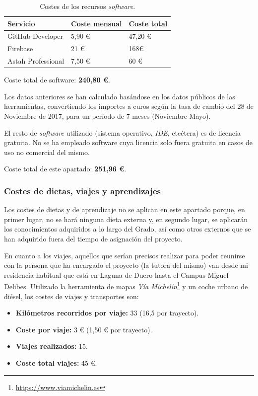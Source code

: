 \documentclass[twoside]{report}
\begin{document}
\begin{table}[H]
\centering
\begin{tabular}{|l|l|l|}
\hline
Servicio         & Coste mensual & Coste total \\ \hline
GitHub Developer & 5,90 \euro        & 47,20 \euro          \\ \hline
Firebase         & 21 \euro      & 168\euro           \\ \hline
Astah Professional & 7,50 \euro & 60 \euro \\ \hline
\end{tabular}
\caption{Costes de los recursos \textit{software}.}
\end{table}

Coste total de software: \textbf{240,80 \euro}.

Los datos anteriores se han calculado basándose en los datos públicos de las herramientas, convertiendo los importes a euros según la tasa de cambio del 28 de Noviembre de 2017, para un período de 7 meses (Noviembre-Mayo).

El resto de \textit{software} utilizado (sistema operativo, \textit{IDE}, etcétera) es de licencia gratuita. No se ha empleado software cuya licencia solo fuera gratuita en casos de uso no comercial del mismo.

Coste total de este apartado: \textbf{251,96 \euro}.

\subsubsection{Costes de dietas, viajes y aprendizajes}

Los costes de dietas y de aprendizaje no se aplican en este apartado porque, en primer lugar, no se hará ninguna dieta externa y, en segundo lugar, se aplicarán los conocimientos adquiridos a lo largo del Grado, así como otros externos que se han adquirido fuera del tiempo de asignación del proyecto.

En cuanto a los viajes, aquellos que serían precisos realizar para poder reunirse con la persona que ha encargado el proyecto (la tutora del mismo) van desde mi residencia habitual que está en Laguna de Duero hasta el Campus Miguel Delibes. Utilizado la herramienta de mapas \textit{Vía Michelín}\footnote{\url{https://www.viamichelin.es}} y un coche urbano de diésel, los costes de viajes y transportes son:

\begin{itemize}
\item \textbf{Kilómetros recorridos por viaje:} 33 (16,5 por trayecto).
\item \textbf{Coste por viaje:} 3 \euro \hspace{0.1cm} (1,50 \euro \hspace{0.1cm} por trayecto).
\item \textbf{Viajes realizados:} 15.
\item \textbf{Coste total viajes:} 45 \euro.
\end{itemize}
\end{document}
